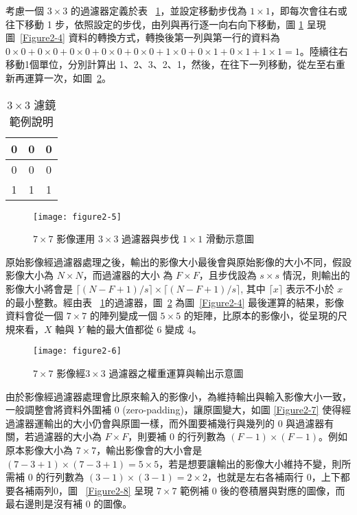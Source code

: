 \documentclass[12pt, a4paper]{article} 				%
\begin{document}
考慮一個 $3\times 3$ 的過濾器定義於表~ \ref{Table-Filter}，並設定移動步伐為 $1\times 1$，即每次會往右或往下移動 1 步，依照設定的步伐，由列與再行逐一向右向下移動，圖 \ref{Figure2-5} 呈現圖~\ref{Figure2-4} 資料的轉換方式，轉換後第一列與第一行的資料為
$0\times 0+0\times 0+0\times 0+0\times 0+0\times 0+1\times 0+0\times 1+0\times 1+1\times 1=1$。陸續往右移動1個單位，分別計算出 1、2、3、2、1，然後，在往下一列移動，從左至右重新再運算一次，如圖~\ref{Figure2-6}。

\begin{table}[!ht]
\begin{center}
\caption{$3\times 3$ 濾鏡範例說明}\label{Table-Filter}
\begin{tabular}{|c|c|c|}\toprule
0 & 0 & 0\\\hline
0 & 0 & 0\\\hline
1 & 1 & 1\\\bottomrule
\end{tabular}
\end{center}
\end{table}

\begin{figure}[!ht]
\begin{center}
\texttt{[image: figure2-5]}
\caption{$7\times 7$ 影像運用 $3\times 3$ 過濾器與步伐 $1\times 1$ 滑動示意圖}\label{Figure2-5}
\end{center}
\end{figure}

原始影像經過濾器處理之後，輸出的影像大小最後會與原始影像的大小不同，假設影像大小為 $N\times N$，而過濾器的大小 為 $F\times F$，且步伐設為 $s\times s$ 情況，則輸出的影像大小將會是 $\lceil (N-F+1)/s\rceil \times \lceil (N-F+1)/s\rceil $, 其中 $\lceil x \rceil$ 表示不小於 $x$ 的最小整數。經由表~ \ref{Table-Filter}的過濾器，圖~\ref{Figure2-6} 為圖~\ref{Figure2-4} 最後運算的結果，影像資料會從一個 $7\times 7$ 的陣列變成一個 $5\times 5$ 的矩陣，比原本的影像小，從呈現的尺規來看，$X$ 軸與 $Y$ 軸的最大值都從 6 變成 4。

\begin{figure}[!ht]
\begin{center}
\texttt{[image: figure2-6]}
\caption{$7\times 7$ 影像經$3\times 3$ 過濾器之權重運算與輸出示意圖}\label{Figure2-6}
\end{center}
\end{figure}

由於影像經過濾器處理會比原來輸入的影像小，為維持輸出與輸入影像大小一致，一般調整會將資料外圍補 0  (zero-padding)，讓原圖變大，如圖 \ref{Figure2-7} 使得經過濾器運輸出的大小仍會與原圖一樣，而外圍要補幾行與幾列的 0 與過濾器有關，若過濾器的大小為 $F\times F$，則要補 0 的行列數為 $(F-1)\times (F-1)$。例如原本影像大小為 $7\times 7$，輸出影像會的大小會是 $(7-3+1)\times (7-3+1)=5\times 5$，若是想要讓輸出的影像大小維持不變，則所需補 0 的行列數為 $(3-1)\times (3-1)=2\times 2$，也就是左右各補兩行 0，上下都要各補兩列0，圖 ~\ref{Figure2-8} 呈現 $7\times 7$ 範例補 0 後的卷積層與對應的圖像，而最右邊則是沒有補 0 的圖像。
\end{document}
